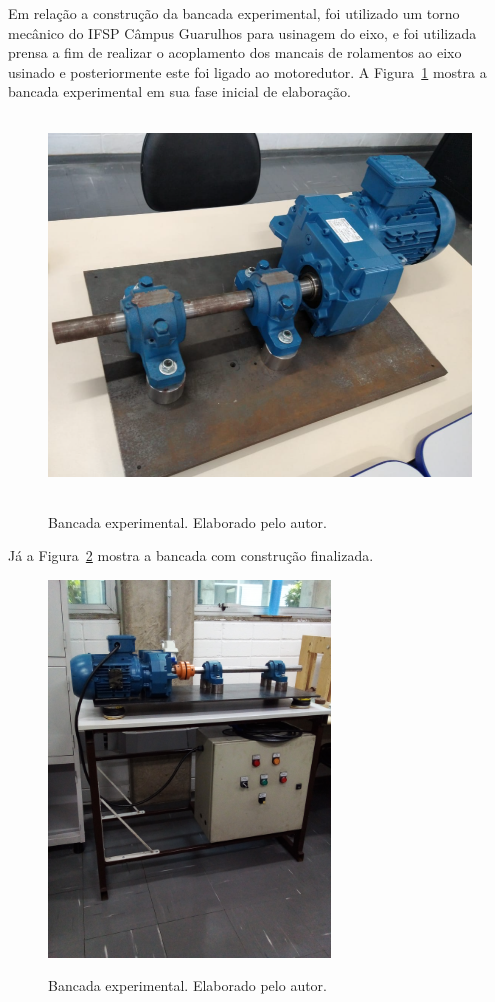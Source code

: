 \documentclass[
	12pt,				
	oneside,			
	a4paper,			
	english,			
	brazil,			
	]{abntex2ppgsi}
\begin{document}
Em relação a construção da bancada experimental, foi utilizado um torno mecânico do IFSP Câmpus Guarulhos para usinagem do eixo, e foi utilizada prensa a fim de realizar o acoplamento dos mancais de rolamentos ao eixo usinado e posteriormente este foi ligado ao motoredutor. A Figura~\ref{bancada_de_testes} mostra a bancada experimental em sua fase inicial de elaboração.

\begin{figure}[H]
\centering
\caption {Bancada experimental. Elaborado pelo autor.}
\includegraphics[width=\textwidth,height=100mm,keepaspectratio]{bancada_de_testes}
\label{bancada_de_testes}
\end{figure}

Já a Figura~\ref{bancada_completa} mostra a bancada com construção finalizada.

\begin{figure}[H]
\centering
\caption {Bancada experimental. Elaborado pelo autor.}
\includegraphics[width=\textwidth,height=100mm,keepaspectratio]{bancada_completa}
\label{bancada_completa}
\end{figure}
\end{document}
